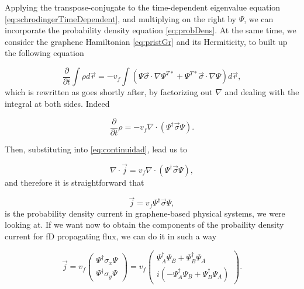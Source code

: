 Applying the transpose-conjugate to the time-dependent eigenvalue equation \eqref{eq:schrodingerTimeDependent}, and multiplying on the right by $\Psi$, we can incorporate the probability density equation \eqref{eq:probDens}. At the same time, we consider the graphene Hamiltonian \eqref{eq:pristGr} and its Hermiticity, to built up the following equation

\begin{equation}
    \label{eq:rho_sigma_nabla}
    \frac{\partial}{\partial t}\int\rho d\vec{r} = -v_f\int\left( \Psi\vec{\sigma}\cdot\nabla\Psi^{T*} + \Psi^{T*}\vec{\sigma}\cdot\nabla\Psi \right)d\vec{r},
\end{equation}
which is rewritten as goes shortly after, by factorizing out $\nabla$ and dealing with the integral at both sides. Indeed

\begin{equation}
    \label{eq:casi_j}
    \frac{\partial}{\partial t}\rho = -v_f\nabla\cdot\left( \Psi^\dagger \vec{\sigma} \Psi \right).
\end{equation}

Then, substituting into \eqref{eq:continuidad}, lead us to 

\begin{equation}
    \label{eq:nablaJ}
    \nabla\cdot\vec{j} = v_f\nabla\cdot\left( \Psi^\dagger \vec{\sigma} \Psi \right),
\end{equation}
and therefore it is straightforward that 

\begin{equation}
    \label{eq:final}
    \vec{j} = v_f\Psi^\dagger \vec{\sigma} \Psi,
\end{equation}
is the probability density current in graphene-based physical systems, we were looking at. If we want now to obtain the components of the probaility density current for fD propagating flux, we can do it in such a way

\begin{equation}
    \label{eq:componentes}
    \vec{j} = v_f\begin{pmatrix}
                     \Psi^\dagger \sigma_x \Psi \\ \Psi^\dagger \sigma_y \Psi
    \end{pmatrix} = v_f\begin{pmatrix}
                           \Psi_A^\dagger\Psi_B + \Psi_B^\dagger\Psi_A \\ i(-\Psi_A^\dagger\Psi_B + \Psi_B^\dagger\Psi_A)
    \end{pmatrix}.
\end{equation}

